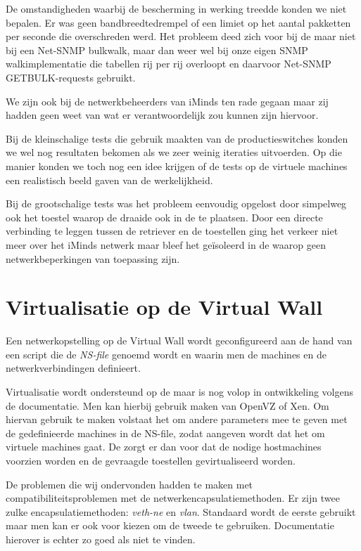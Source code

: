 De omstandigheden waarbij de bescherming in werking treedde konden we niet bepalen.
Er was geen bandbreedtedrempel of een limiet op het aantal pakketten per seconde die overschreden werd.
Het probleem deed zich voor bij de \nwmretriever{} maar niet bij een Net-SNMP bulkwalk,
maar dan weer wel bij onze eigen SNMP walkimplementatie die tabellen rij per rij overloopt en daarvoor Net-SNMP GETBULK-requests gebruikt.

We zijn ook bij de netwerkbeheerders van iMinds ten rade gegaan maar zij hadden geen weet van wat er verantwoordelijk zou kunnen zijn hiervoor.

Bij de kleinschalige tests die gebruik maakten van de productieswitches konden we wel nog resultaten bekomen als we zeer weinig iteraties uitvoerden.
Op die manier konden we toch nog een idee krijgen of de tests op de virtuele machines een realistisch beeld gaven van de werkelijkheid.

Bij de grootschalige tests was het probleem eenvoudig opgelost door simpelweg ook het toestel waarop de \nwmretriever{} draaide ook in de \vwall{} te plaatsen.
Door een directe verbinding te leggen tussen de retriever en de toestellen ging het verkeer niet meer over het iMinds netwerk maar bleef het geïsoleerd in de \vwall{} waarop geen netwerkbeperkingen van toepassing zijn.


\section{Virtualisatie op de Virtual Wall}
\label{probleem-virtualisatie-vwall}

Een netwerkopstelling op de Virtual Wall wordt geconfigureerd aan de hand van een script die de \textit{NS-file} genoemd wordt en
waarin men de machines en de netwerkverbindingen definieert.

Virtualisatie wordt ondersteund op de \vwall{} maar is nog volop in ontwikkeling volgens de documentatie.
Men kan hierbij gebruik maken van OpenVZ of Xen\cite{vwall-openvz, vwall-xen}.
Om hiervan gebruik te maken volstaat het om andere parameters mee te geven met de gedefinieerde machines in de NS-file,
zodat aangeven wordt dat het om virtuele machines gaat.
De \vwall{} zorgt er dan voor dat de nodige hostmachines voorzien worden en de gevraagde toestellen gevirtualiseerd worden.

De problemen die wij ondervonden hadden te maken met compatibiliteitsproblemen met de netwerkencapsulatiemethoden.
Er zijn twee zulke encapsulatiemethoden: \textit{veth-ne} en \textit{vlan}.
Standaard wordt de eerste gebruikt maar men kan er ook voor kiezen om de tweede te gebruiken.
Documentatie hierover is echter zo goed als niet te vinden.

